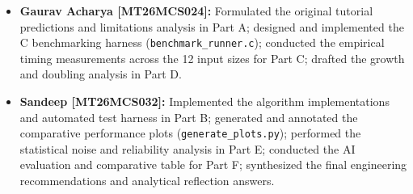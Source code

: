 \documentclass[11pt]{article}
\begin{document}
\begin{itemize}[itemsep=0.1em, topsep=0.1em]
    \item \textbf{Gaurav Acharya [MT26MCS024]:}
    Formulated the original tutorial predictions and limitations analysis in Part A; designed and implemented the C benchmarking harness (\texttt{benchmark\_runner.c}); conducted the empirical timing measurements across the 12 input sizes for Part C; drafted the growth and doubling analysis in Part D.

    \item \textbf{Sandeep [MT26MCS032]:}
    Implemented the algorithm implementations and automated test harness in Part B; generated and annotated the comparative performance plots (\texttt{generate\_plots.py}); performed the statistical noise and reliability analysis in Part E; conducted the AI evaluation and comparative table for Part F; synthesized the final engineering recommendations and analytical reflection answers.
\end{itemize}
\end{document}
